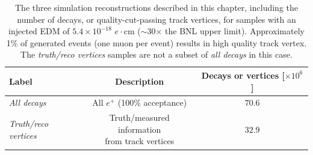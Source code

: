 \begin{table}[t!]
\centering
\begin{tabular}{l|cc}
\hline
\hline
Label & Description & Decays or vertices [$\times10^{6}$] \\ 
\hline
\textit{All decays} & All $e^{+}$ (100\% acceptance) & $70.6$ \\ 
\textit{Truth/reco vertices} & \makecell{Truth/measured information \\ from track vertices} & $32.9$ \\ 
\hline
\hline
\end{tabular}
\caption{The three simulation reconstructions described in this chapter, including the number of decays, or quality-cut-passing track vertices, for samples with an injected EDM of $5.4\times10^{-18}$ $e\cdot\text{cm}$ ($\sim30$$\times$ the BNL upper limit). Approximately 1\% of generated events (one muon per event) results in high quality track vertex. The \textit{truth/reco vertices} samples are not a subset of \textit{all decays} in this case.} 
\label{tbl:SimSamples}
\end{table}

